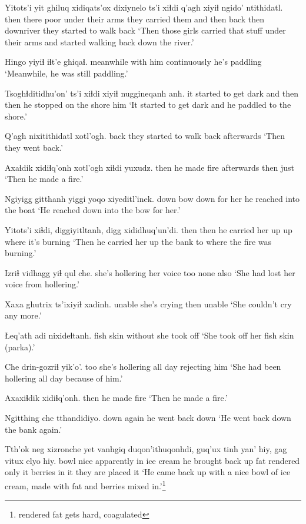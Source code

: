 \documentclass[12pt]{article}
\begin{document}
\gll Yitots'i yit ghiluq xidiqats'ox      dixiynelo         ts'i xiɬdi q'agh xiyiɬ ngido'    ntithidatl.
then   there  poor   {under their arms} {they carried them} and then back  then  downriver {they started to walk back}
\glt `Then those girls carried that stuff under their arms and started walking back down the river.'
\glend

\gll Hingo     yiyiɬ    iɬt'e        ghiqaɬ.
meanwhile {with him} continuously {he's paddling}
\glt `Meanwhile, he was still paddling.'
\glend

\gll Tsoghɬditidhu'on'      ts'i xiɬdi xiyiɬ    nuggineqanh             anh.
{it started to get dark} and then  then {he stopped on the shore} him
\glt `It started to get dark and he paddled to the shore.'
\glend

\gll Q'agh nixitithidatl xotl'ogh.
back  {they started to walk back}  afterwards
\glt `Then they went back.'
\glend

\gll Axaɬdik xidiɬq'onh   xotl'ogh  xiɬdi yuxudz.
then    {he made fire} afterwards then just
\glt `Then he made a fire.'
\glend
  
\gll Ngiyigg gitthanh yiggi yoqo   xiyeditl'inek.
down   bow      down  {for her} {he reached into the boat}
\glt `He reached down into the bow for her.'
\glend

\gll Yitots'i xiɬdi, diggiyitltanh, digg xididhuq'un'di.
then     then  {he carried her up} up {where it's burning}
\glt `Then he carried her up the bank to where the fire was burning.'
\glend

\gll Izriɬ           vidhagg   yiɬ qul che. 
{she's hollering} {her voice} too none also
\glt `She had lost her voice from hollering.'
\glend

\gll Xaxa ghutrix ts'ixiyiɬ xadinh.
unable   {she's crying} then  unable
\glt `She couldn't cry any more.'
\glend

\gll Łeq'ath adi nixideɬtanh.
{fish skin} without  {she took off}
\glt `She took off her fish skin (parka).'
\glend

\gll Che drin-gozriɬ             yik'o'.
too {she's hollering all day} {rejecting him}
\glt `She had been hollering all day because of him.'
\glend

\gll Axaxiɬdik xidiɬq'onh.
then      {he made fire}
\glt `Then he made a fire.'
\glend

\gll Ngitthing che   tthandidiyo.
down      again {he went back down}
\glt `He went back down the bank again.'
\glend

\gll Tth'ok neg  xizronche yet vanhgiq   duqon'ithuqonhdi, guq'ux tinh       yan' hiy,  gag     vitux elyo            hiy.
bowl   nice  apparently       in  {ice cream} {he brought back up} fat    rendered only it berries {in it} {they are placed} it
\glt `He came back up with a nice bowl of ice cream, made with fat and berries mixed in.'\footnote{rendered fat gets hard, coagulated}
\glend
\end{document}
